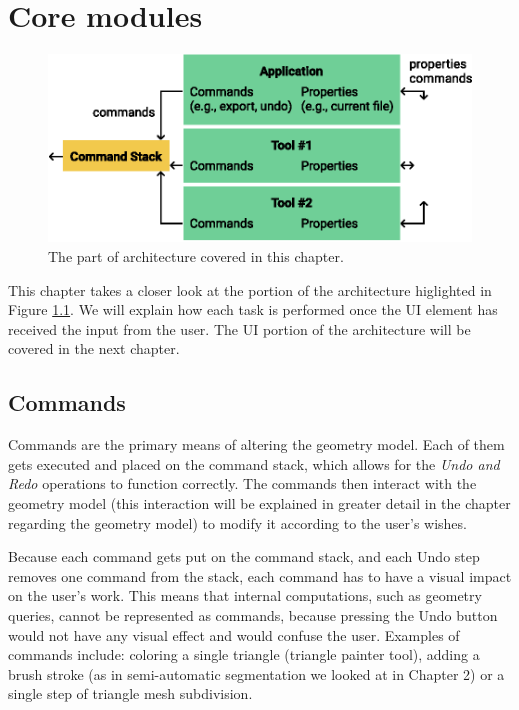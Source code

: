 \chapter{Core modules}

\begin{figure}[b]
	\centering
	\includegraphics[scale=0.9]{images/architecture_commandstack}
	\caption{The part of architecture covered in this chapter.}
	\label{fig:architecture_commandstack}
\end{figure}

This chapter takes a closer look at the portion of the architecture higlighted in Figure \ref{fig:architecture_commandstack}. We will explain how each task is performed once the UI element has received the input from the user. The UI portion of the architecture will be covered in the next chapter.


\section{Commands}
Commands are the primary means of altering the geometry model. Each of them gets executed and placed on the command stack, which allows for the \textit{Undo and Redo} operations to function correctly. The commands then interact with the geometry model (this interaction will be explained in greater detail in the chapter regarding the geometry model) to modify it according to the user's wishes.

Because each command gets put on the command stack, and each Undo step removes one command from the stack, each command has to have a visual impact on the user's work. This means that internal computations, such as geometry queries, cannot be represented as commands, because pressing the Undo button would not have any visual effect and would confuse the user. Examples of commands include: coloring a single triangle (triangle painter tool), adding a brush stroke (as in semi-automatic segmentation we looked at in Chapter 2) or a single step of triangle mesh subdivision.

